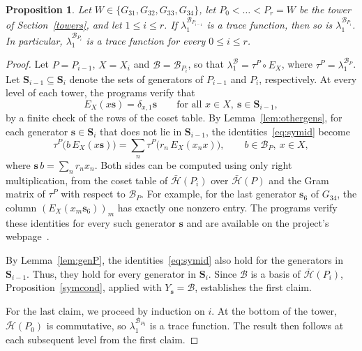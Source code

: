 \documentclass[11pt, reqno]{amsart}
\newcommand{\cB}{\mathcal{B}}
\newcommand{\cH}{\mathcal{H}}
\numberwithin{equation}{section}
\newtheorem{proposition}[theorem]{Proposition}
\theoremstyle{remark}
\begin{document}
\begin{proposition}\label{prop:symmetry}
	Let $W\in\{G_{31},G_{32},G_{33},G_{34}\}$, let $P_0<\dots<P_r=W$ be the tower of Section~\ref{towers}, and let $1\le i\le r$. If $\lambda_1^{\cB_{P_{i-1}}}$ is a trace function, then so is $\lambda_1^{\cB_{P_i}}$. In particular, $\lambda_1^{\cB_{P_i}}$ is a trace function for every $0\le i\le r$.
\end{proposition}
\begin{proof}
	Let $P=P_{i-1}$, $X=X_i$ and $\cB=\cB_{P_i}$, so that $\lambda_1^{\cB}=\tau^P\circ E_X$, where $\tau^P=\lambda_1^{\cB_P}$. Let $\mathbf S_{i-1}\subseteq\mathbf S_i$ denote the sets of generators of $P_{i-1}$ and $P_i$, respectively. At every level of each tower, the programs verify that
	\[
	E_X(x\mathbf s)=\delta_{x,1}\mathbf s
	\qquad\text{for all }x\in X,\ \mathbf s\in\mathbf S_{i-1},
	\]
	by a finite check of the rows of the coset table. By Lemma~\ref{lem:othergens}, for each generator $\mathbf s\in\mathbf S_i$ that does not lie in $\mathbf S_{i-1}$, the identities~\eqref{eq:symid} become
	\[
	\tau^P\bigl(b\,E_X(x\mathbf s)\bigr)
	=\sum_n\tau^P\bigl(r_n\,E_X(x_nx)\bigr),
	\qquad b\in\cB_P,\ x\in X,
	\]
	where $\mathbf s\,b=\sum_n r_nx_n$. Both sides can be computed using only right multiplication, from the coset table of $\bar{\cH}(P_i)$ over $\bar{\cH}(P)$ and the Gram matrix of $\tau^P$ with respect to $\cB_P$. For example, for the last generator $\mathbf s_6$ of $G_{34}$, the column $(E_X(x_m\mathbf s_6))_m$ has exactly one nonzero entry. The programs verify these identities for every such generator $\mathbf s$ and are available on the project's webpage~\cite{web}.
	
	By Lemma~\ref{lem:genP}, the identities~\eqref{eq:symid} also hold for the generators in $\mathbf S_{i-1}$. Thus, they hold for every generator in $\mathbf S_i$. Since $\cB$ is a basis of $\bar{\cH}(P_i)$, Proposition~\ref{symcond}, applied with $Y_{\mathbf s}=\cB$, establishes the first claim.
	
	For the last claim, we proceed by induction on $i$. At the bottom of the tower, $\bar{\cH}(P_0)$ is commutative, so $\lambda_1^{\cB_{P_0}}$ is a trace function. The result then follows at each subsequent level from the first claim.
\end{proof}
\end{document}
